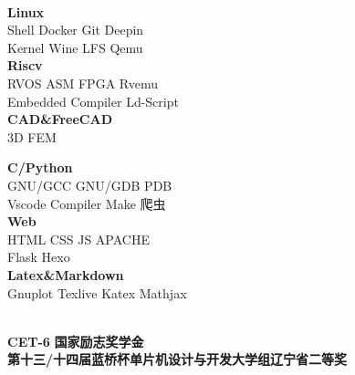 \documentclass{ctexart}
\begin{document}
\begin{center}
    \hrulefill \\
    \begin{minipage}[t]{18em}
        \centering
        \textbf{Linux} \\
        Shell \quad Docker \quad Git \quad Deepin \\
        Kernel \quad Wine \quad LFS \quad Qemu \\
        
        \textbf{Riscv} \\
        RVOS \quad ASM \quad FPGA \quad Rvemu \\
        Embedded \quad Compiler \quad Ld-Script \\
        \textbf{CAD\&FreeCAD} \\
        3D \quad FEM \\
    \end{minipage}
    \quad 
    \begin{minipage}[t]{18em}
        \centering
        \textbf{C/Python} \\
        GNU/GCC \quad GNU/GDB \quad PDB \\
        Vscode \quad Compiler \quad Make \quad 爬虫\\
        \textbf{Web} \\
        HTML \quad CSS \quad JS \quad APACHE \\
        Flask \quad Hexo \\
        \textbf{Latex\&Markdown}\\
        Gnuplot \quad Texlive \quad Katex \quad Mathjax \\
    \end{minipage}
    \quad
\end{center}

\begin{center}
    \hrulefill \\
    \textbullet \textbf{CET-6 } \qquad 
    \textbullet \textbf{国家励志奖学金}\\
    \textbullet \textbf{第十三/十四届蓝桥杯单片机设计与开发大学组辽宁省二等奖}
\end{center}
\end{document}
